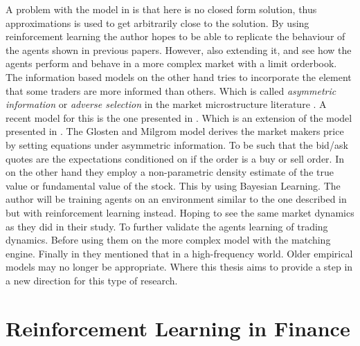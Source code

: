 \documentclass{kththesis}
\theoremstyle{definition}
\begin{document}
A problem with the model in \parencite{ho1981optimal} is that here is no closed form solution, thus approximations is used to get arbitrarily close to the solution. By using reinforcement learning the author hopes to be able to replicate the behaviour of the agents shown in previous papers. However, also extending it, and see how the agents perform and behave in a more complex market with a limit orderbook. The information based models on the other hand tries to incorporate the element that some traders are more informed than others. Which is called \textit{asymmetric information} or \textit{adverse selection} in the market microstructure literature \parencite{o1995market, hasbrouck2007empirical}. 
\newline
\newline
A recent model for this is the one presented in \parencite{das2003intelligent, das2005learning}. Which is an extension of the model presented in \textcite{glosten1985bid}. The Glosten and Milgrom model derives the market makers price by setting equations under asymmetric information. To be such that the bid/ask quotes are the expectations conditioned on if the order is a buy or sell order. In \textcite{das2005learning} on the other hand they employ a non-parametric density estimate of the true value or fundamental value of the stock. This by using Bayesian Learning. 
\newline
\newline
The author will be training agents on an environment similar to the one described in \parencite{das2005learning} but with reinforcement learning instead. Hoping to see the same market dynamics as they did in their study. To further validate the agents learning of trading dynamics. Before using them on the more complex model with the matching engine. Finally in \textcite{o2015high} they mentioned that in a high-frequency world. Older empirical models may no longer be appropriate. Where this thesis aims to provide a step in a new direction for this type of research.

\newpage
\section{Reinforcement Learning in Finance}
\end{document}
